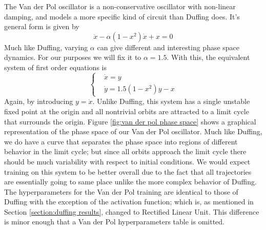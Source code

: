 The Van der Pol oscillator is a non-conservative oscillator with non-linear damping, and models a more 
specific kind of circuit than Duffing does. It's general form is given by 
\begin{equation}
    \ddot{x} - \alpha(1 - x^2)\dot{x} + x = 0
\end{equation}
Much like Duffing, varying $\alpha$ can give different and interesting phase space dynamics. For our
purposes we will fix it to $\alpha = 1.5$. With this, the equivalent system of first order equations
is 
\begin{equation}
    \begin{cases}
        & \dot{x} = y \\
        & \dot{y} = 1.5(1 - x^2)y - x  
    \end{cases}
\end{equation}
Again, by introducing $y = \dot{x}$. Unlike Duffing, this system has a single unstable fixed point
at the origin and all nontrivial orbits are attracted to a limit cycle that surrounds the origin. 
Figure \ref{fig:van der pol phase space} shows a graphical representation of the phase space of our 
Van der Pol oscillator. Much like Duffing, we do have a curve that separates the phase space into 
regions of different behavior in the limit cycle; but since all orbits approach the limit cycle there
should be much variability with respect to initial conditions. We would expect training on this system 
to be better overall due to the fact that all trajectories are essentially going to same place unlike
the more complex behavior of Duffing. The hyperparameters for the Van der Pol
training are identical to those of Duffing with the exception of the activation function; which is, 
as mentioned in Section \ref{section:duffing results}, changed to Rectified Linear Unit. This difference 
is minor enough that a Van der Pol hyperparameters table is omitted. 
